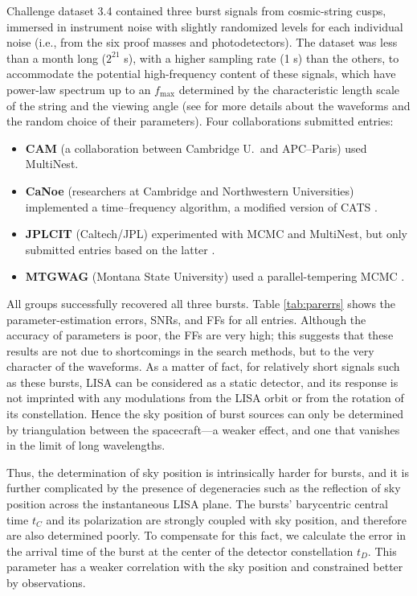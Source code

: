 \documentclass{iopart}
\begin{document}
Challenge dataset 3.4 contained three burst signals from cosmic-string cusps, immersed in instrument noise with slightly randomized levels for each individual noise (i.e., from the six proof masses and photodetectors). The dataset was less than a month long ($2^{21}$ s), with a higher sampling rate (1 s) than the others, to accommodate the potential high-frequency content of these signals, which have power-law spectrum up to an $f_\mathrm{max}$ determined by the characteristic length scale of the string and the viewing angle (see \cite{MLDC3} for more details about the waveforms and the random choice of their parameters). Four collaborations submitted entries:
%
\begin{itemize}
\item \textbf{CAM} (a collaboration between Cambridge U.\ and APC--Paris) used MultiNest.
\item \textbf{CaNoe} (researchers at Cambridge and Northwestern Universities) implemented a time--frequency algorithm, a modified version of CATS \cite{CATS}.
\item \textbf{JPLCIT} (Caltech/JPL) experimented with MCMC and MultiNest, but only submitted entries based on the latter \cite{cohen2009}.
\item \textbf{MTGWAG} (Montana State University) used a parallel-tempering MCMC \cite{keycornish}. 
\end{itemize}
%
All groups successfully recovered all three bursts. Table \ref{tab:parerrs} shows the parameter-estimation errors, SNRs, and FFs for all entries. 
Although the accuracy of parameters is poor, the FFs are very high; this suggests that these results are not due to shortcomings in the search methods, but to the very character of the waveforms. As a matter of fact, for relatively short signals such as these bursts, LISA can be considered as a static detector, and its response is not imprinted with any modulations from the LISA orbit or from the rotation of its constellation. Hence the sky position of burst sources can only be determined by triangulation between the spacecraft---a weaker effect, and one that vanishes in the limit of long wavelengths.

Thus, the determination of sky position is intrinsically harder for bursts, and it is further complicated by the presence of degeneracies \cite{keycornish} such as the reflection of sky position across the instantaneous LISA plane. The bursts' barycentric central time $t_C$ and its polarization are strongly coupled with sky position, and therefore are also determined poorly. To compensate for this fact, we calculate the error in the arrival time of the burst at the center of the detector constellation $t_D$. This parameter has a weaker correlation with the sky position and constrained better by observations.
\end{document}
